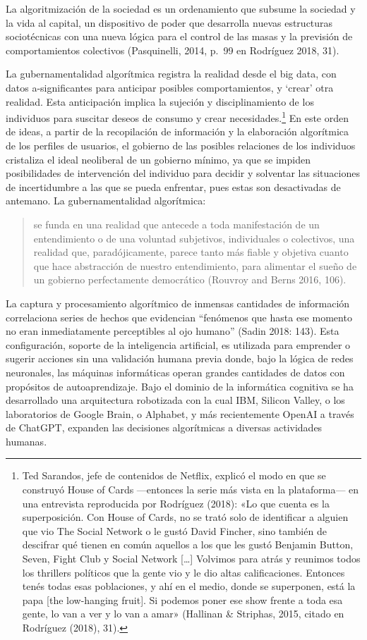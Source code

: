 \documentclass[
]{interact}
\begin{document}
La algoritmización de la sociedad es un ordenamiento que subsume la
sociedad y la vida al capital, un dispositivo de poder que desarrolla
nuevas estructuras sociotécnicas con una nueva lógica para el control de
las masas y la previsión de comportamientos colectivos (Pasquinelli,
2014, p.~99 en Rodríguez 2018, 31).

La gubernamentalidad algorítmica registra la realidad desde el big data,
con datos a-significantes para anticipar posibles comportamientos, y
`crear' otra realidad. Esta anticipación implica la sujeción y
disciplinamiento de los individuos para suscitar deseos de consumo y
crear necesidades.\footnote{Ted Sarandos, jefe de contenidos de Netflix,
  explicó el modo en que se construyó House of Cards ---entonces la
  serie más vista en la plataforma--- en una entrevista reproducida por
  Rodríguez (2018): «Lo que cuenta es la superposición. Con House of
  Cards, no se trató solo de identificar a alguien que vio The Social
  Network o le gustó David Fincher, sino también de descifrar qué tienen
  en común aquellos a los que les gustó Benjamin Button, Seven, Fight
  Club y Social Network {[}\ldots{]} Volvimos para atrás y reunimos
  todos los thrillers políticos que la gente vio y le dio altas
  calificaciones. Entonces tenés todas esas poblaciones, y ahí en el
  medio, donde se superponen, está la papa {[}the low-hanging fruit{]}.
  Si podemos poner ese show frente a toda esa gente, lo van a ver y lo
  van a amar» (Hallinan \& Striphas, 2015, citado en Rodríguez (2018),
  31).} En este orden de ideas, a partir de la recopilación de
información y la elaboración algorítmica de los perfiles de usuarios, el
gobierno de las posibles relaciones de los individuos cristaliza el
ideal neoliberal de un gobierno mínimo, ya que se impiden posibilidades
de intervención del individuo para decidir y solventar las situaciones
de incertidumbre a las que se pueda enfrentar, pues estas son
desactivadas de antemano. La gubernamentalidad algorítmica:

\begin{quote}
se funda en una realidad que antecede a toda manifestación de un
entendimiento o de una voluntad subjetivos, individuales o colectivos,
una realidad que, paradójicamente, parece tanto más fiable y objetiva
cuanto que hace abstracción de nuestro entendimiento, para alimentar el
sueño de un gobierno perfectamente democrático (Rouvroy and Berns 2016,
106).
\end{quote}

La captura y procesamiento algorítmico de inmensas cantidades de
información correlaciona series de hechos que evidencian ``fenómenos que
hasta ese momento no eran inmediatamente perceptibles al ojo humano''
(Sadin 2018: 143). Esta configuración, soporte de la inteligencia
artificial, es utilizada para emprender o sugerir acciones sin una
validación humana previa donde, bajo la lógica de redes neuronales, las
máquinas informáticas operan grandes cantidades de datos con propósitos
de autoaprendizaje. Bajo el dominio de la informática cognitiva se ha
desarrollado una arquitectura robotizada con la cual IBM, Silicon
Valley, o los laboratorios de Google Brain, o Alphabet, y más
recientemente OpenAI a través de ChatGPT, expanden las decisiones
algorítmicas a diversas actividades humanas.
\end{document}
